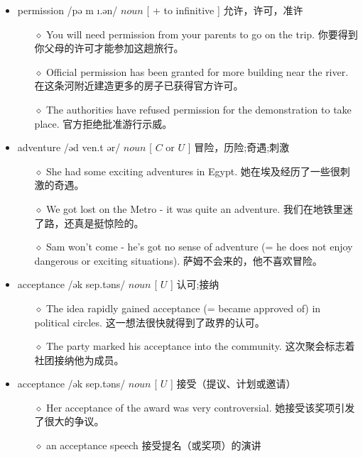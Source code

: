 \documentclass[a4paper,top=2.5cm,buttom=2.5cm10.5pt]{book}
\begin{document}
\begin{itemize}
\item permission /pə \textprimstress m \i  \textesh .ən/ $ noun $ [ + to infinitive ] 允许，许可，准许
\begin{itemize}
\item[$\diamond$] You will need permission from your parents to go on the trip.
你要得到你父母的许可才能参加这趟旅行。
\item[$\diamond$] Official permission has been granted for more building near the river.
在这条河附近建造更多的房子已获得官方许可。
\item[$\diamond$] The authorities have refused permission for the demonstration to take place.
官方拒绝批准游行示威。
\end{itemize}
\end{itemize}
\begin{itemize}
\item adventure /əd \textprimstress ven.t \textesh ər/ $ noun $ [  $ C $  or  $ U $  ] 冒险，历险;奇遇;刺激
\begin{itemize}
\item[$\diamond$] She had some exciting adventures in Egypt.
她在埃及经历了一些很刺激的奇遇。
\item[$\diamond$] We got lost on the Metro - it was quite an adventure.
我们在地铁里迷了路，还真是挺惊险的。
\item[$\diamond$] Sam won't come - he's got no sense of adventure (= he does not enjoy dangerous or exciting situations).
萨姆不会来的，他不喜欢冒险。
\end{itemize}
\end{itemize}
\begin{itemize}
\item acceptance /ək \textprimstress sep.təns/ $ noun $ [  $ U $  ] 认可;接纳
\begin{itemize}
\item[$\diamond$] The idea rapidly gained acceptance (= became approved of) in political circles.
这一想法很快就得到了政界的认可。
\item[$\diamond$] The party marked his acceptance into the community.
这次聚会标志着社团接纳他为成员。
\end{itemize}
\end{itemize}
\begin{itemize}
\item acceptance /ək \textprimstress sep.təns/ $ noun $ [  $ U $  ] 接受（提议、计划或邀请）
\begin{itemize}
\item[$\diamond$] Her acceptance of the award was very controversial.
她接受该奖项引发了很大的争议。
\item[$\diamond$] an acceptance speech
接受提名（或奖项）的演讲
\end{itemize}
\end{itemize}
\end{document}
